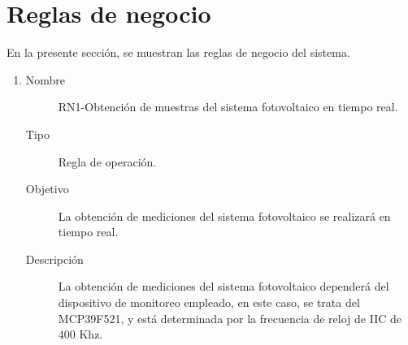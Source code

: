 \section{Reglas de negocio}
En la presente sección, se muestran las reglas de negocio del sistema.
\begin{enumerate}[label=RN\arabic*.]
    \item \label{RN1}
		\begin{description}
			\item[Nombre] RN1-Obtención de muestras del sistema fotovoltaico en tiempo real.
			\item[Tipo] Regla de operación.
			\item[Objetivo] La obtención de mediciones del sistema fotovoltaico se realizará en tiempo real.
			\item[Descripción] La obtención de mediciones del sistema fotovoltaico dependerá del dispositivo de monitoreo empleado, en este caso, se trata del MCP39F521, y está determinada por la frecuencia de reloj de IIC de 400 Khz. 
    		\end{description}
    		

\end{enumerate}
